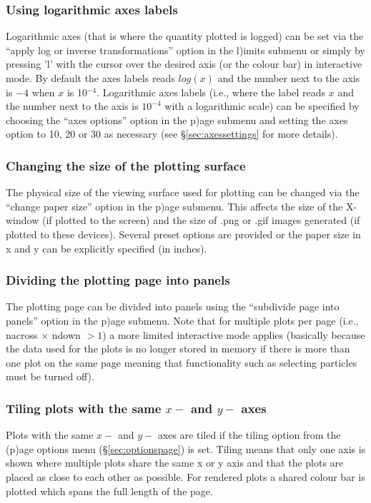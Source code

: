 \documentclass[a4paper,10pt]{article}
\begin{document}
\subsubsection{ Using logarithmic axes labels}
\label{sec:loglabels}
 Logarithmic axes (that is where the quantity plotted is logged) can be set via the ``apply log or inverse transformations'' option in the l)imits submenu or simply by pressing 'l' with the cursor over the desired axis (or the colour bar) in interactive mode. By default the axes labels reads $log(x)$ and the number next to the axis is $-4$ when $x$ is 10$^{-4}$. Logarithmic axes labels (i.e., where the label reads $x$ and the number next to the axis is $10^{-4}$ with a logarithmic scale) can be specified by choosing the ``axes options'' option in the p)age submenu and setting the axes option to 10, 20 or 30 as necessary (see \S\ref{sec:axessettings} for more details). 

\subsubsection{ Changing the size of the plotting surface}
\label{sec:papersize}
 The physical size of the viewing surface used for plotting can be changed via the ``change paper size'' option in the p)age submenu. This affects the size of the X-window (if plotted to the screen) and the size of .png or .gif images generated (if plotted to these devices). Several preset options are provided or the paper size in x and y can be explicitly specified (in inches).

\subsubsection{ Dividing the plotting page into panels}
\label{sec:nacrossndown}
The plotting page can be divided into panels using the ``subdivide page into panels'' option in the p)age submenu. Note that for multiple plots per page (i.e., nacross $\times$ ndown $> 1$) a more limited interactive mode applies (basically because the data used for the plots is no longer stored in memory if there is more than one plot on the same page meaning that functionality such as selecting particles must be turned off).

\subsubsection{ Tiling plots with the same $x-$ and $y-$ axes}
\label{sec:tiling}
 Plots with the same $x-$ and $y-$ axes are tiled if the tiling
option from the (p)age options menu (\S\ref{sec:optionspage}) is set. Tiling means that only one axis is shown where multiple plots share the same x or y axis and that the plots are placed as close to each other as possible. For rendered plots a shared colour bar is plotted which spans the full length of the page.
\end{document}
